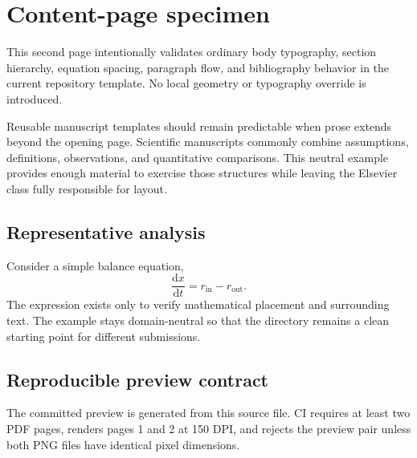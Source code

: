 \documentclass[preprint,12pt]{elsarticle}
\begin{document}
\clearpage
\section{Content-page specimen}
This second page intentionally validates ordinary body typography, section hierarchy, equation spacing, paragraph flow, and bibliography behavior in the current repository template. No local geometry or typography override is introduced.

Reusable manuscript templates should remain predictable when prose extends beyond the opening page. Scientific manuscripts commonly combine assumptions, definitions, observations, and quantitative comparisons. This neutral example provides enough material to exercise those structures while leaving the Elsevier class fully responsible for layout.

\subsection{Representative analysis}
Consider a simple balance equation,
\begin{equation}
  \frac{\mathrm{d}x}{\mathrm{d}t}=r_{\mathrm{in}}-r_{\mathrm{out}}.
\end{equation}
The expression exists only to verify mathematical placement and surrounding text. The example stays domain-neutral so that the directory remains a clean starting point for different submissions.

\subsection{Reproducible preview contract}
The committed preview is generated from this source file. CI requires at least two PDF pages, renders pages 1 and 2 at 150 DPI, and rejects the preview pair unless both PNG files have identical pixel dimensions.



\end{document}
